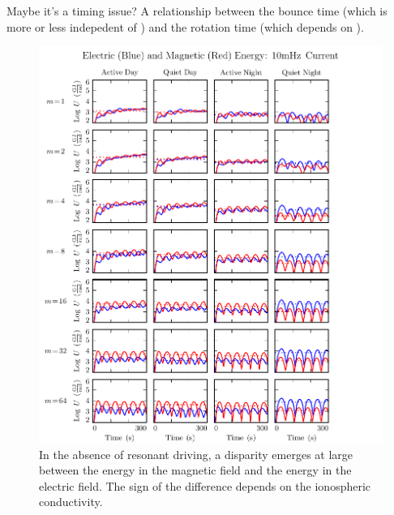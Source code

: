Maybe it's a timing issue? A relationship between the bounce time (which is more or less indepedent of \azm) and the rotation time (which depends on \azm). 


\begin{figure}[H]
    \centering
    \includegraphics[width=\textwidth]{figures/U_BE_010mHz.pdf}
    \caption[Current-Driven Electric and Magnetic Energy: 10mHz]{
      In the absence of resonant driving, a disparity emerges at large \azm between the energy in the magnetic field and the energy in the electric field. The sign of the difference depends on the ionospheric conductivity. 
    }
    \label{fig_U_BE_010mHz}
\end{figure}


